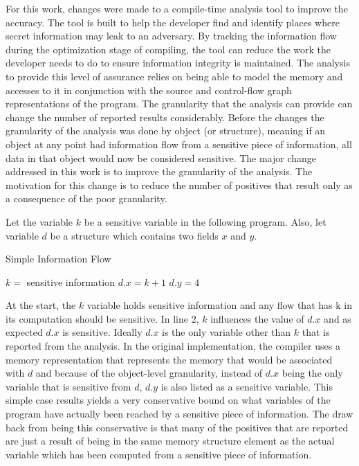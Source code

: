 \documentclass[11pt,a4paper]{article}
\begin{document}
  For this work, changes were made to a compile-time analysis tool to improve the
  accuracy. The tool is built to help the developer find and identify places where
  secret information may leak to an adversary. By tracking the information flow
  during the optimization stage of compiling, the tool can reduce the work the
  developer needs to do to ensure information integrity is maintained. The
  analysis to provide this level of assurance relies on being able to model the
  memory and accesses to it in conjunction with the source and control-flow graph
  representations of the program. The granularity that the analysis can provide
  can change the number of reported results considerably. Before the changes the
  granularity of the analysis was done by object (or structure), meaning if an
  object at any point had information flow from a sensitive piece of information,
  all data in that object would now be considered sensitive. The major change
  addressed in this work is to improve the granularity of the analysis. The
  motivation for this change is to reduce the number of positives that result only
  as a consequence of the poor granularity.

  Let the variable $k$ be a sensitive variable in the following program. Also, let
  variable $d$ be a structure which contains two fields $x$ and $y$.

  \begin{algorithm}
    \caption{Simple Information Flow}
  \begin{algorithmic}
    \State $k =$ sensitive information
    \State $d.x =  k + 1$
    \State $d.y = 4$
  \end{algorithmic}
  \end{algorithm}

  At the start, the $k$ variable holds sensitive information and any flow that has k
  in its computation should be sensitive. In line 2, $k$ influences the value of $d.x$
  and as expected $d.x$ is sensitive. Ideally $d.x$ is the only variable other
  than $k$ that is reported from the analysis. In the original implementation,
  the compiler uses a memory representation that represents the memory that would
  be associated with $d$ and because of the object-level granularity, instead of
  $d.x$ being the only variable that is sensitive from $d$, $d.y$ is also listed
  as a sensitive variable. This simple case results yields a very conservative
  bound on what variables of the program have actually been reached by a sensitive
  piece of information. The draw back from being this conservative is that many of
  the positives that are reported are just a result of being in the same memory
  structure element as the actual variable which has been computed from a
  sensitive piece of information.
\end{document}
